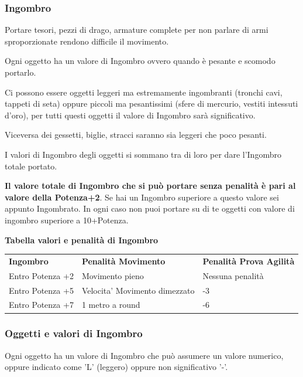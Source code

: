 \documentclass[a4paper,11pt,twoside,openany]{book}
\begin{document}
\label{capacituxe0-di-carico-e-trasporto-ingombro}

\subsubsection{Ingombro}

Portare tesori, pezzi di drago, armature complete per non parlare di armi sproporzionate rendono difficile il movimento.

Ogni oggetto ha un valore di Ingombro ovvero quando è pesante e scomodo portarlo.


Ci possono essere oggetti leggeri ma estremamente ingombranti (tronchi cavi, tappeti di seta) oppure piccoli ma pesantissimi (sfere di mercurio, vestiti intessuti d'oro), per tutti questi oggetti il valore di Ingombro sarà significativo.


Viceversa dei gessetti, biglie, stracci saranno sia leggeri che poco pesanti.

I valori di Ingombro degli oggetti si sommano tra di loro per dare l'Ingombro totale portato.

\textbf{Il valore totale di Ingombro che si può portare senza penalità è pari al valore della Potenza+2}.
Se hai un Ingombro superiore a questo valore sei appunto Ingombrato. In ogni caso non puoi portare su di te oggetti con valore di ingombro superiore a 10+Potenza.

\bigskip

\textbf{Tabella valori e penalità di Ingombro}

\medskip

\begin{tabular}{lll}
	\hline
	\textbf{Ingombro} & \textbf{ Penalità Movimento}  & \textbf{Penalità Prova Agilità} \\
	Entro Potenza +2  & Movimento pieno               & Nessuna penalità                \\
	Entro Potenza +5  & Velocita' Movimento dimezzato & -3                              \\
	Entro Potenza +7  & 1 metro a round               & -6                              \\
\end{tabular}

\subsubsection{Oggetti e valori di Ingombro}

Ogni oggetto ha un valore di Ingombro che può assumere un valore numerico, oppure indicato come 'L' (leggero) oppure non significativo '-'.
\end{document}
